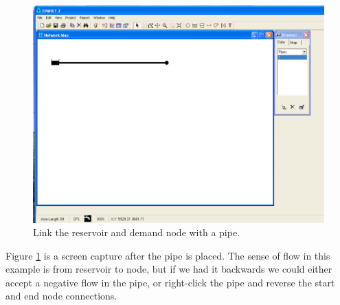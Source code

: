 \begin{figure}[htbp] %
   \centering
   \includegraphics[width=5in]{add-link.pdf} 
   \caption{Link the reservoir and demand node with a pipe.}
   \label{fig:add-link}
\end{figure}

Figure \ref{fig:add-link} is a screen capture after the pipe is placed.  The sense of flow in this example is from reservoir to node, but if we had it backwards we could either accept a negative flow in the pipe, or right-click the pipe and reverse the start and end node connections.

